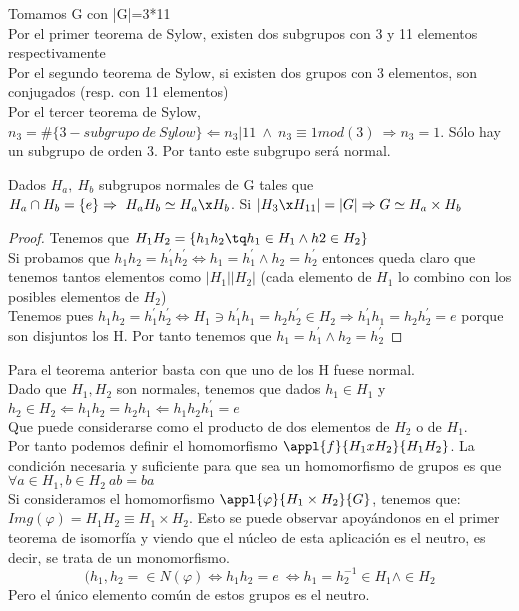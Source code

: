 \documentclass[nochap]{apuntes}
\begin{document}
 \begin{example}
  Tomamos G con |G|=3*11\\
  Por el primer teorema de Sylow, existen dos subgrupos con 3 y 11 elementos respectivamente\\
  Por el segundo teorema de Sylow, si existen dos grupos con 3 elementos, son conjugados (resp. con 11 elementos)\\
  Por el tercer teorema de Sylow, $n_3=\#\{3-subgrupo \ de \ Sylow\} \Leftarrow n_3|11 \ \wedge \ n_3\equiv 1 mod(3) \ \Rightarrow n_3=1$.
  Sólo hay un subgrupo de orden 3. Por tanto este subgrupo será normal.
 \end{example}

 \begin{theorem}
  Dados $H_a, \ H_b$  subgrupos normales de G tales que $H_a\cap H_b = \{e\} \Rightarrow \ H_aH_b \simeq H_a \x H_b$. Si $|H_3\x H_{11}|=|G| \Rightarrow G\simeq H_a\times H_b$
 \end{theorem}
 \begin{proof}
  Tenemos que $H_1H_2=\{h_1h_2\tq h_1\in H_1 \wedge h2\in H_2\}$\\
  Si probamos que $h_1h_2=h_1^{'}h_2^{'} \Leftrightarrow h_1=h_1^{'} \wedge h_2=h_2^{'}$  entonces queda claro que tenemos tantos elementos como
  $|H_1||H_2|$ (cada elemento de $H_1$  lo combino con los posibles elementos de $H_2$)\\
  Tenemos pues $h_1h_2=h_1^{'}h_2^{'} \Leftrightarrow H_1\ni h_1^{'}h_1=h_2h_2^{'} \in H_2 \Rightarrow h_1^{'}h_1=h_2h_2^{'}=e$  porque son
  disjuntos los H. Por tanto tenemos que $h_1=h_1^{'} \wedge h_2=h_2^{'}$
 \end{proof}

 Para el teorema anterior basta con que uno de los H fuese normal.\\
 Dado que $H_1, H_2$ son normales, tenemos que dados $h_1\in H_1$  y $h_2\in H_2 \Leftarrow h_1h_2=h_2h_1 \Leftarrow h_1h_2h_1^{'}=e$\\
 Que puede considerarse como el producto de dos elementos de $H_2$  o de $H_1$.\\
 Por tanto podemos definir el homomorfismo $\appl{f}{H_1xH_2}{H_1H_2}$. La condición necesaria y suficiente para que sea un homomorfismo
 de grupos es que $\forall a \in H_1, b \in H_2 \ ab=ba$\\
 Si consideramos el homomorfismo $\appl{\varphi}{H_1\times H_2}{G}$, tenemos que:\\
 $Img(\varphi)=H_1H_2\equiv H_1 \times H_2$. Esto se puede observar apoyándonos en el primer teorema de isomorfía y viendo que el
 núcleo de esta aplicación es el neutro, es decir, se trata de un monomorfismo.\\
 \[(h_1,h_2=\in N(\varphi) \Leftrightarrow h_1h_2=e \ \Leftrightarrow h_1=h_2^{-1}\in H_1 \wedge \in H_2\]
 Pero el único elemento común de estos grupos es el neutro.\\
\end{document}
